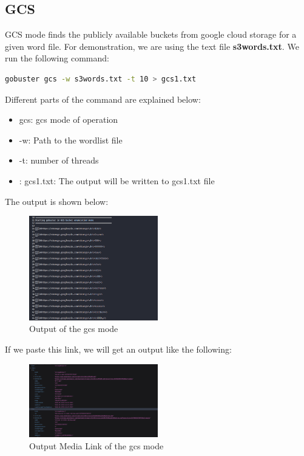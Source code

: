 \documentclass[12 pt]{article}
\begin{document}
\subsection{GCS}
GCS mode finds the publicly available buckets from google cloud storage for a given word file. For demonstration, we are using the text file \textbf{s3words.txt}. We run the following command:
\begin{lstlisting}[language=bash]
gobuster gcs -w s3words.txt -t 10 > gcs1.txt 
\end{lstlisting}
Different parts of the command are explained below:
\begin{itemize}
    \item gcs: gcs mode of operation
    \item -w: Path to the wordlist file
    \item -t: number of threads
    \item: gcs1.txt: The output will be written to gcs1.txt file
\end{itemize}
The output is shown below:
\begin{figure}[!htbp]
    \centering
    \includegraphics[width=0.5\textwidth]{gcs_Output.png}
    \caption{Output of the gcs mode}
    \label{fig: gcs Output}
\end{figure}
\newline
If we paste this link, we will get an output like the following:
\begin{figure}[!htbp]
    \centering
    \includegraphics[width=0.5\textwidth]{gcs_Output_MediaLink.png}
    \caption{Output Media Link of the gcs mode}
    \label{fig: gcs Output Media Link}
\end{figure}
\end{document}
